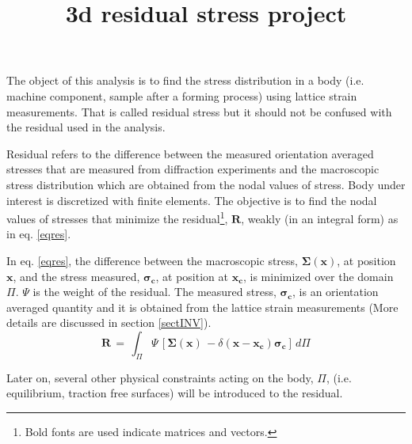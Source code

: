 \documentclass{article}
\begin{document}
\date{}



\title{3d residual stress project}
\maketitle





{}
\printnomenclature

The object of this analysis is to find the stress distribution in a body (i.e. machine component, sample after a forming process) using lattice strain measurements. That is called residual stress but it should not be confused with the residual used in the analysis.

Residual refers to the difference between the measured orientation averaged stresses that are measured from diffraction experiments and the macroscopic stress distribution which are obtained from the nodal values of stress. Body under interest is discretized with finite elements. The objective is to find the nodal values of stresses that minimize the residual\footnote{Bold fonts are used indicate matrices and vectors.}, $\mathbf{R}$, weakly (in an integral form) as in eq. \eqref{eqres}.

In eq. \eqref{eqres}, the difference between the macroscopic stress, $\mathbf{\Sigma(x)}$, at position $\mathbf{x}$, and the stress measured, $\mathbf{\sigma_c}$, at position at $\mathbf{x_c}$, is minimized over the domain $\Pi$. $\Psi$ is the weight of the residual. The measured stress, $\mathbf{\sigma_c}$, is an orientation averaged quantity and it is obtained from the lattice strain measurements (More details are discussed in section \ref{sectINV}). 
\begin{equation}
\mathbf{R} \,=\, \int_\Pi \Psi \, [\mathbf{\Sigma(x)} \, -\delta(\mathbf{x}-\mathbf{x_c}) \mathbf{\sigma_c}] \,d\Pi
\label{eqres}
\end{equation}

Later on, several other physical constraints acting on the body, $\Pi$, (i.e. equilibrium, traction free surfaces) will be introduced to the residual. 


\end{document}
